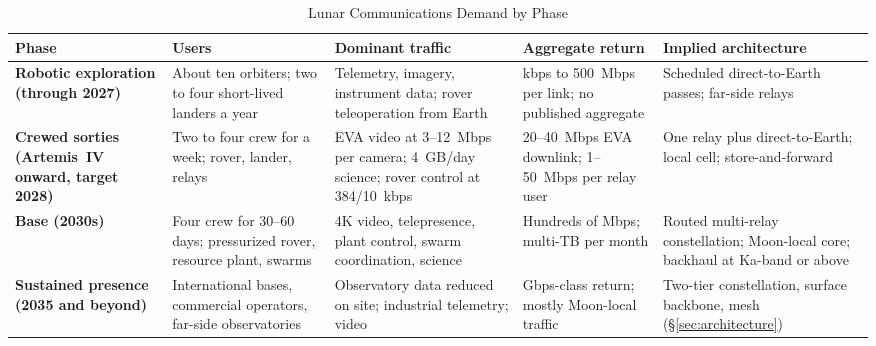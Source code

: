\documentclass{IEEEoj}
\begin{document}
\begin{table}[!t]
\caption{Lunar Communications Demand by Phase}
\label{tab:phases}
\centering
\footnotesize
\begin{tabularx}{\textwidth}{@{}>{\raggedright\arraybackslash\bfseries}p{2.6cm}>{\raggedright\arraybackslash}p{3.4cm}>{\raggedright\arraybackslash}p{3.6cm}>{\raggedright\arraybackslash}p{3.3cm}>{\raggedright\arraybackslash}X}
\toprule
\rowcolor{tabhead}\textbf{Phase} & \textbf{Users} & \textbf{Dominant traffic} & \textbf{Aggregate return} & \textbf{Implied architecture} \\
\midrule
Robotic exploration (through 2027) & About ten orbiters; two to four short-lived landers a year & Telemetry, imagery, instrument data; rover teleoperation from Earth & kbps to \SI{500}{Mbps} per link; no published aggregate & Scheduled direct-to-Earth passes; far-side relays \\
Crewed sorties (Artemis~IV onward, target 2028) & Two to four crew for a week; rover, lander, relays & EVA video at \SI{3}{}--\SI{12}{Mbps} per camera; \SI{4}{GB/day} science; rover control at \SI{384}{}/\SI{10}{kbps} & \SI{20}{}--\SI{40}{Mbps} EVA downlink; \SI{1}{}--\SI{50}{Mbps} per relay user & One relay plus direct-to-Earth; local cell; store-and-forward \\
Base (2030s) & Four crew for 30--60 days; pressurized rover, resource plant, swarms & 4K video, telepresence, plant control, swarm coordination, science & Hundreds of Mbps; multi-TB per month & Routed multi-relay constellation; Moon-local core; backhaul at Ka-band or above \\
Sustained presence (2035 and beyond) & International bases, commercial operators, far-side observatories & Observatory data reduced on site; industrial telemetry; video & Gbps-class return; mostly Moon-local traffic & Two-tier constellation, surface backbone, mesh (\S\ref{sec:architecture}) \\
\bottomrule
\end{tabularx}
\end{table}
\end{document}
